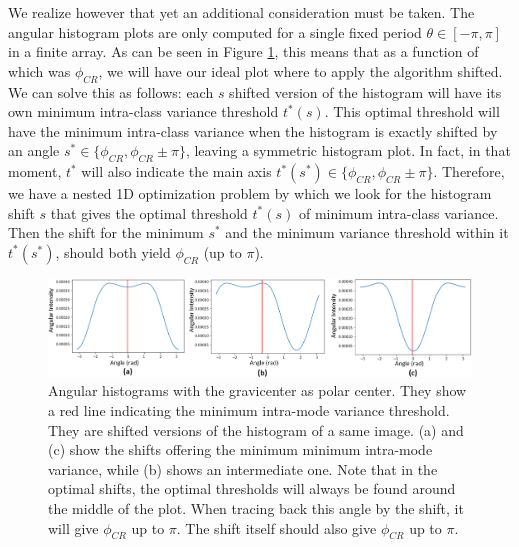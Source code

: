 \documentclass[11pt, a4paper, twoside]{article} %
\begin{document}
We realize however that yet an additional consideration must be taken. The angular histogram plots are only computed for a single fixed period $\theta\in[-\pi,\pi]$ in a finite array. As can be seen in Figure \ref{fig:histo}, this means that as a function of which was $\phi_{CR}$, we will have our ideal plot where to apply the algorithm shifted. We can solve this as follows: each $s$ shifted version of the histogram will have its own minimum intra-class variance threshold $t^*(s)$. This optimal threshold will have the minimum intra-class variance when the histogram is exactly shifted by an angle $s^*\in\{\phi_{CR},\phi_{CR}\pm\pi\}$, leaving a symmetric histogram plot. In fact, in that moment, $t^*$ will also indicate the main axis $t^*(s^*)\in\{\phi_{CR},\phi_{CR}\pm\pi\}$. Therefore, we have a nested 1D optimization problem by which we look for the histogram shift $s$ that gives the optimal threshold $t^*(s)$ of minimum intra-class variance. Then the shift for the minimum $s^*$ and the minimum variance threshold within it $t^*(s^*)$, should both yield $\phi_{CR}$ (up to $\pi$).
\begin{figure}[h!] 
     \centering 
    \includegraphics[width=0.98\linewidth]{bimod.PNG}
    \caption{ Angular histograms with the gravicenter as polar center. They show a red line indicating the minimum intra-mode variance threshold. They are shifted versions of the histogram of a same image. (a) and (c) show the shifts offering the minimum minimum intra-mode variance, while (b) shows an intermediate one. Note that in the optimal shifts, the optimal thresholds will always be found around the middle of the plot. When tracing back this angle by the shift, it will give $\phi_{CR}$ up to $\pi$. The shift itself should also give $\phi_{CR}$ up to $\pi$.}
    \label{fig:histo}\vspace{-0.35cm}
\end{figure}
\end{document}
